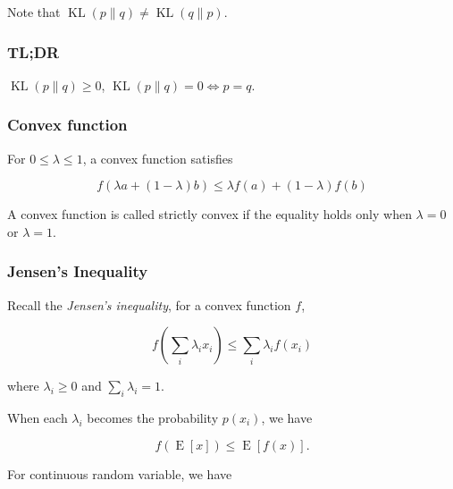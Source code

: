 \documentclass{article}
\begin{document}
            Note that $ \operatorname{KL}(p \| q) \neq \operatorname{KL}(q \| p) $.

            \subsubsection*{TL;DR}

                $ \operatorname{KL}(p \| q) \geq 0 $, $ \operatorname{KL}(p \| q) = 0 \iff p = q $.


            \subsubsection*{Convex function}

                For $ 0 \leq \lambda \leq 1 $, a convex function satisfies

                \begin{equation*}
                    f(\lambda a + (1 - \lambda) b) \leq \lambda f(a) + (1 - \lambda) f(b)
                \end{equation*}

                A convex function is called strictly convex if the equality
                holds only when $ \lambda = 0 $ or $ \lambda = 1 $.

            \subsubsection*{Jensen's Inequality}

                Recall the \textit{Jensen's inequality}, for a convex function $ f $,

                \begin{equation*}
                    f \left( \sum_{i} \lambda_{i} x_{i}  \right) \leq \sum_{i} \lambda_{i} f(x_{i})
                \end{equation*}

                where $ \lambda_{i} \geq 0 $ and $ \sum_{i} \lambda_{i} = 1 $.

                When each $ \lambda_{i} $ becomes the probability $ p(x_{i}) $, we have

                \begin{equation*}
                    f\left( \operatorname{E}[x] \right) \leq \operatorname{E}[f(x)].
                \end{equation*}

                For continuous random variable, we have
\end{document}
